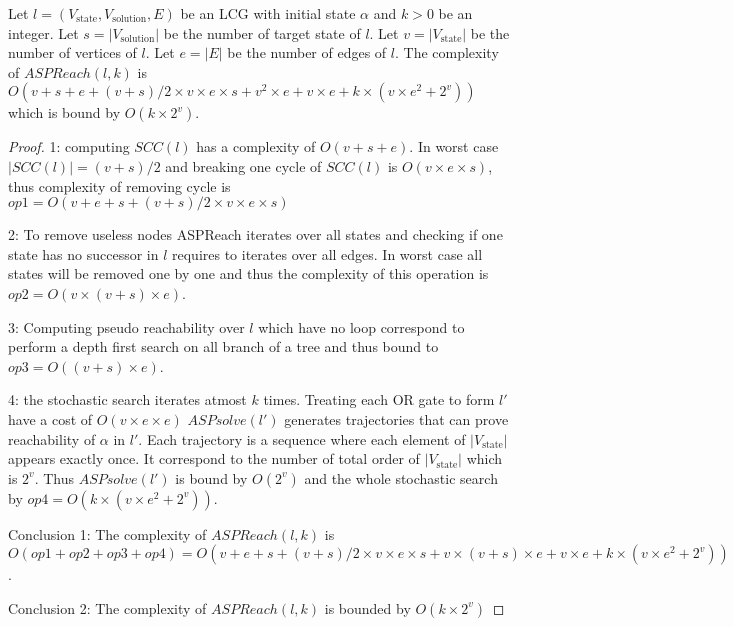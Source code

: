 \documentclass{entcs}
\begin{document}
\begin{theorem}
    Let $l=(V_{\mathrm{state}},V_{\mathrm{solution}}, E)$ be an LCG with initial state $\alpha$ and $k > 0$ be an integer.
    Let $s=|V_{\mathrm{solution}}|$ be the number of target state of $l$.
    Let $v = |V_{\mathrm{state}}|$ be the number of vertices of $l$.
    Let $e=|E|$ be the number of edges of $l$.
    The complexity of $ASPReach(l,k)$ is $O(v + s + e + (v+s) / 2 \times v \times e \times s + v^{2} \times e + v \times e + k \times (v \times e^{2} + 2^{v}))$ which is bound by $O(k \times 2^{v})$.
    \begin{proof}
    
        1: computing $SCC(l)$ has a complexity of $O(v + s + e)$.
        In worst case $|SCC(l)| = (v+s) / 2$ and breaking one cycle of $SCC(l)$ is $O(v \times e \times s)$, thus complexity of removing cycle is $op1=O(v+ e + s + (v+s) / 2 \times v \times e \times s)$
        
        2: To remove useless nodes ASPReach iterates over all states and checking if one state has no successor in $l$ requires to iterates over all edges.
        In worst case all states will be removed one by one and thus the complexity of this operation is $op2=O(v \times (v+s) \times e)$.
        
        3: Computing pseudo reachability over $l$ which have no loop correspond to perform a depth first search on all branch of a tree and thus bound to $op3=O((v+s) \times e)$.
        
        4: the stochastic search iterates atmost $k$ times.
        Treating each OR gate to form $l'$ have a cost of $O(v \times e \times e)$
        $ASPsolve(l')$ generates trajectories that can prove reachability of $\alpha$ in $l'$.
        Each trajectory is a sequence where each element of $|V_{\mathrm{state}}|$ appears exactly once.
        It correspond to the number of total order of $|V_{\mathrm{state}}|$ which is $2^{v}$.
        Thus $ASPsolve(l')$ is bound by $O(2^{v})$ and the whole stochastic search by $op4=O(k \times (v \times e^{2} + 2^{v}))$.
        
        Conclusion 1: The complexity of $ASPReach(l,k)$ is $O(op1 + op2 + op3 + op4) = O(v + e + s + (v+s) / 2  \times v \times e \times s + v \times (v+s) \times e + v \times e + k \times (v \times e^{2} + 2^{v}))$.
        
        Conclusion 2: The complexity of $ASPReach(l,k)$ is bounded by $O(k \times 2^{v})$
    \end{proof}
\end{theorem}
\end{document}
